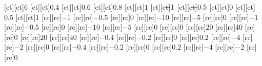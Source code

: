 [ct][ct]{\matlabtextA $6$}%
[ct][ct]{\matlabtextA $0.4$}%
[ct][ct]{\matlabtextA $0.6$}%
[ct][ct]{\matlabtextA $0.8$}%
[ct][ct]{\matlabtextA $1$}%
[ct][ct]{\matlabtextA $\matlabfragNegXTick 1$}%
[ct][ct]{\matlabtextA $\matlabfragNegXTick 0.5$}%
[ct][ct]{\matlabtextA $0$}%
[ct][ct]{\matlabtextA $0.5$}%
[ct][ct]{\matlabtextA $1$}%
%
%
%
[rc][rc]{\matlabtextA $-1$}%
[rc][rc]{\matlabtextA $-0.5$}%
[rc][rc]{\matlabtextA $0$}%
[rc][rc]{\matlabtextA $-10$}%
[rc][rc]{\matlabtextA $-5$}%
[rc][rc]{\matlabtextA $0$}%
[rc][rc]{\matlabtextA $-1$}%
[rc][rc]{\matlabtextA $-0.5$}%
[rc][rc]{\matlabtextA $0$}%
[rc][rc]{\matlabtextA $-10$}%
[rc][rc]{\matlabtextA $-5$}%
[rc][rc]{\matlabtextA $0$}%
[rc][rc]{\matlabtextA $0$}%
[rc][rc]{\matlabtextA $20$}%
[rc][rc]{\matlabtextA $40$}%
[rc][rc]{\matlabtextA $0$}%
[rc][rc]{\matlabtextA $20$}%
[rc][rc]{\matlabtextA $40$}%
[rc][rc]{\matlabtextA $-0.4$}%
[rc][rc]{\matlabtextA $-0.2$}%
[rc][rc]{\matlabtextA $0$}%
[rc][rc]{\matlabtextA $0.2$}%
[rc][rc]{\matlabtextA $-4$}%
[rc][rc]{\matlabtextA $-2$}%
[rc][rc]{\matlabtextA $0$}%
[rc][rc]{\matlabtextA $-0.4$}%
[rc][rc]{\matlabtextA $-0.2$}%
[rc][rc]{\matlabtextA $0$}%
[rc][rc]{\matlabtextA $0.2$}%
[rc][rc]{\matlabtextA $-4$}%
[rc][rc]{\matlabtextA $-2$}%
[rc][rc]{\matlabtextA $0$}%
%

